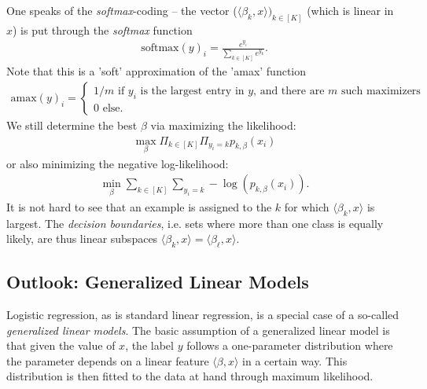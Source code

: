\documentclass{article}
\newcommand{\sprod}[1]{\langle #1 \rangle}
\begin{document}
One speaks of the \emph{softmax}-coding -- the vector ($\sprod{\beta_k,x})_{k\in [K]}$ (which is linear in $x$) is put through the \emph{softmax} function
\begin{align*}
    \mathrm{softmax}(y)_i = \frac{e^{y_i}}{\sum_{k \in [K]}e^{y_k}}.
\end{align*}
Note that this is a 'soft' approximation of the 'amax' function
\begin{align*}
    \mathrm{amax}(y)_i = \begin{cases}
        1/m \text{ if } y_i \text{ is the largest entry in $y$, and there are $m$ such maximizers } \\
        0 \text{ else.}
    \end{cases}
\end{align*}
We still determine the best $\beta$ via maximizing the likelihood:
\begin{align*}
    \max_\beta \Pi_{k \in [K]} \Pi_{y_i=k} p_{k,\beta}(x_i)
\end{align*}
or also minimizing the negative log-likelihood:
\begin{align*}
    \min_\beta \sum_{k \in [K]} \sum_{y_i=k} - \log(p_{k,\beta}(x_i)).
\end{align*}
It is not hard to see that an example is assigned to the $k$ for which $\sprod{\beta_k,x}$ is largest. The \emph{decision boundaries}, i.e. sets where more than one class is equally likely, are thus linear subspaces $\sprod{\beta_k,x}=\sprod{\beta_\ell,x}$.

\subsection{Outlook: Generalized Linear Models}
Logistic regression, as is standard linear regression, is a special case of a so-called \emph{generalized linear models}. The basic assumption of a generalized linear model is that given the value of $x$, the label $y$ follows a one-parameter distribution where the parameter depends on a linear feature $\sprod{\beta,x}$ in  a certain way. This distribution is then fitted to the data at hand through maximum likelihood.
\end{document}
